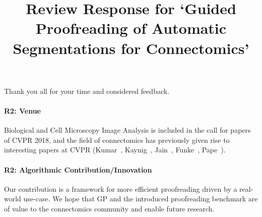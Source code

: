 \documentclass[10pt,twocolumn,letterpaper]{article}
\begin{document}
\title{\vspace{-0.5cm}Review Response for `Guided Proofreading of Automatic Segmentations for Connectomics'}  %

\maketitle
\thispagestyle{empty}

\noindent Thank you all for your time and considered feedback.

\paragraph{R2: Venue} Biological and Cell Microscopy Image Analysis is included in the call for papers of CVPR 2018, and the field of connectomics has previously given rise to interesting papers at CVPR (Kumar~, Kaynig~, Jain~, Funke~, Pape~). %

\paragraph{R2: Algorithmic Contribution/Innovation} Our contribution is a framework for more efficient proofreading driven by a real-world use-case. We hope that GP and the introduced proofreading benchmark are of value to the connectomics community and enable future research.%


\end{document}
